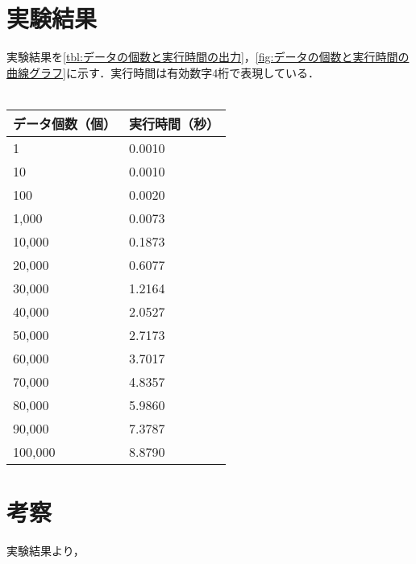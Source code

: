 \section{実験結果}
実験結果を\ref{tbl:データの個数と実行時間の出力}，\ref{fig:データの個数と実行時間の曲線グラフ}に示す．実行時間は有効数字4桁で表現している．\\
\dotfill\\
\begin{minipage}[t]{0.35\textwidth}
    \begin{center}
        \label{tbl:データの個数と実行時間の出力}
        \begin{tabular}{ll}
            \multicolumn{1}{c}{データ個数（個）} & \multicolumn{1}{c}{実行時間（秒）} \\
            \hline
            1                            & 0.0010                      \\
            10                           & 0.0010                      \\
            100                          & 0.0020                      \\
            1,000                        & 0.0073                      \\
            10,000                       & 0.1873                      \\
            20,000                       & 0.6077                      \\
            30,000                       & 1.2164                      \\
            40,000                       & 2.0527                      \\
            50,000                       & 2.7173                      \\
            60,000                       & 3.7017                      \\
            70,000                       & 4.8357                      \\
            80,000                       & 5.9860                      \\
            90,000                       & 7.3787                      \\
            100,000                      & 8.8790                      \\
            \hline
        \end{tabular}
    \end{center}
\end{minipage}
\begin{minipage}[t]{0.6\textwidth}
    \centering
    \label{fig:データの個数と実行時間の曲線グラフ}
\end{minipage}
\section{考察}
実験結果より，
